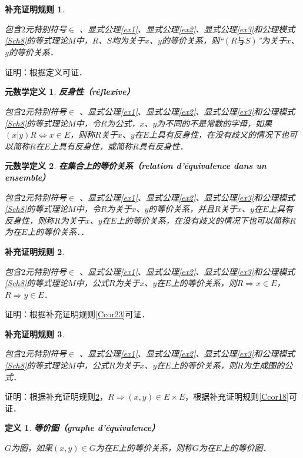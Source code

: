 \documentclass[12pt, a4paper, oneside]{book}
\newtheorem{metadef}{元数学定义}
\newtheorem{Ccor}{补充证明规则}
\newtheorem{de}{定义}
\begin{document}
			\begin{Ccor}\label{Ccor24}
				\hfill\par
				包含$2$元特别符号$\in$ 、显式公理\ref{ex1}、显式公理\ref{ex2}、显式公理\ref{ex3}和公理模式\ref{Sch8}的等式理论$M$中，$R$、$S$均为关于$x$、$y$的等价关系，则“$(R\text{与}S)$”为关于$x$、$y$的等价关系．
			\end{Ccor}
			证明：根据定义可证．				
				
			\begin{metadef}
				\textbf{反身性（réflexive）}
				\par
				包含$2$元特别符号$\in$ 、显式公理\ref{ex1}、显式公理\ref{ex2}、显式公理\ref{ex3}和公理模式\ref{Sch8}的等式理论$M$中，令$R$为公式，$x$、$y$为不同的不是常数的字母，如果$(x|y)R\Leftrightarrow x\in E$，则称$R$关于$x$、$y$在$E$上具有反身性，在没有歧义的情况下也可以简称$R$在$E$上具有反身性，或简称$R$具有反身性．
			\end{metadef}

			\begin{metadef}
				\textbf{在集合上的等价关系（relation d'équivalence dans un ensemble）}
				\par
				包含$2$元特别符号$\in$ 、显式公理\ref{ex1}、显式公理\ref{ex2}、显式公理\ref{ex3}和公理模式\ref{Sch8}的等式理论$M$中，令$R$为关于$x$、$y$的等价关系，并且$R$关于$x$、$y$在$E$上具有反身性，则称$R$为关于$x$、$y$在$E$上的等价关系，在没有歧义的情况下也可以简称$R$为在$E$上的等价关系．．
			\end{metadef}

			\begin{Ccor}\label{Ccor25}
				\hfill\par
				包含$2$元特别符号$\in$ 、显式公理\ref{ex1}、显式公理\ref{ex2}、显式公理\ref{ex3}和公理模式\ref{Sch8}的等式理论$M$中，公式$R$为关于$x$、$y$在$E$上的等价关系，则$R\Rightarrow x\in E$，$R\Rightarrow y\in E$．				
			\end{Ccor}
			证明：根据补充证明规则\ref{Ccor23}可证．

			\begin{Ccor}\label{Ccor26}
				\hfill\par
				包含$2$元特别符号$\in$ 、显式公理\ref{ex1}、显式公理\ref{ex2}、显式公理\ref{ex3}和公理模式\ref{Sch8}的等式理论$M$中，公式$R$为关于$x$、$y$在$E$上的等价关系，则$R$为生成图的公式．				
			\end{Ccor}
			证明：根据补充证明规则\ref{Ccor25}，$R\Rightarrow (x, y)\in E\times E$，根据补充证明规则\ref{Ccor18}可证．

			\begin{de}
				\textbf{等价图（graphe d'équivalence）}
				\par
				$G$为图，如果$(x, y)\in G$为在$E$上的等价关系，则称$G$为在$E$上的等价图．
			\end{de}
\end{document}
